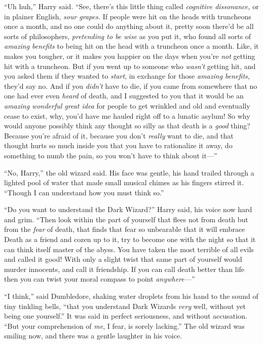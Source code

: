 “Uh huh,” Harry said. “See, there’s this little thing called \emph{cognitive dissonance,} or in plainer English, \emph{sour grapes.} If people were hit on the heads with truncheons once a month, and no one could do anything about it, pretty soon there’d be all sorts of philosophers, \emph{pretending to be wise} as you put it, who found all sorts of \emph{amazing benefits} to being hit on the head with a truncheon once a month. Like, it makes you tougher, or it makes you happier on the days when you’re \emph{not} getting hit with a truncheon. But if you went up to someone who \emph{wasn’t} getting hit, and you asked them if they wanted to \emph{start}, in exchange for those \emph{amazing benefits,} they’d say no. And if you \emph{didn’t} have to die, if you came from somewhere that no one had ever even \emph{heard} of death, and I suggested to you that it would be an \emph{amazing wonderful great idea} for people to get wrinkled and old and eventually cease to exist, why, you’d have me hauled right off to a lunatic asylum! So why would anyone possibly think any thought so silly as that death is a \emph{good} thing? Because you’re afraid of it, because you don’t \emph{really} want to die, and that thought hurts so much inside you that you have to rationalize it away, do something to numb the pain, so you won’t have to think about it—”

“No, Harry,” the old wizard said. His face was gentle, his hand trailed through a lighted pool of water that made small musical chimes as his fingers stirred it. “Though I can understand how you must think so.”

“Do you want to understand the Dark Wizard?” Harry said, his voice now hard and grim. “Then look within the part of yourself that flees not from death but from the \emph{fear} of death, that finds that fear so unbearable that it will embrace Death as a friend and cozen up to it, try to become one with the night so that it can think itself master of the abyss. You have taken the most terrible of all evils and called it good! With only a slight twist that same part of yourself would murder innocents, and call it friendship. If you can call death better than life then you can twist your moral compass to point \emph{anywhere—}”

“I think,” said Dumbledore, shaking water droplets from his hand to the sound of tiny tinkling bells, “that you understand Dark Wizards \emph{very} well, without yet being one yourself.” It was said in perfect seriousness, and without accusation. “But your comprehension of \emph{me}, I fear, is sorely lacking.” The old wizard was smiling now, and there was a gentle laughter in his voice.

